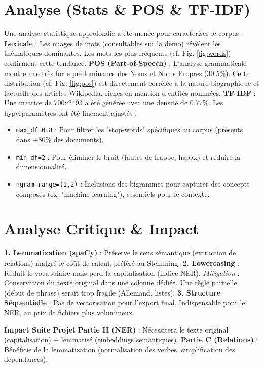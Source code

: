 \documentclass[10pt,a4paper,twocolumn]{article}
\begin{document}
\section*{Analyse (Stats \& POS \& TF-IDF)}
Une analyse statistique approfondie a été menée pour caractériser le corpus :
\textbf{Lexicale} : Les nuages de mots (consultables sur la démo) révèlent les thématiques dominantes. Les mots les plus fréquents (cf. Fig. \ref{fig:words}) confirment cette tendance.
\textbf{POS (Part-of-Speech)} : L'analyse grammaticale montre une très forte prédominance des Noms et Noms Propres (30.5\%). Cette distribution (cf. Fig. \ref{fig:pos}) est directement corrélée à la nature biographique et factuelle des articles Wikipédia, riches en mention d'entités nommées.
\textbf{TF-IDF} : Une matrice de 700x2493 a été générée avec une densité de 0.77\%. Les hyperparamètres ont été finement ajustés :
\begin{itemize}
    \item \texttt{max\_df=0.8} : Pour filtrer les "stop-words" spécifiques au corpus (présents dans +80\% des documents).
    \item \texttt{min\_df=2} : Pour éliminer le bruit (fautes de frappe, hapax) et réduire la dimensionnalité.
    \item \texttt{ngram\_range=(1,2)} : Inclusions des bigrammes pour capturer des concepts composés (ex: "machine learning"), essentiels pour le contexte.
\end{itemize}

\section*{Analyse Critique \& Impact}
\textbf{1. Lemmatization (spaCy)} : Préserve le sens sémantique (extraction de relations) malgré le coût de calcul, préféré au Stemming.
\textbf{2. Lowercasing} : Réduit le vocabulaire mais perd la capitalisation (indice NER). \textit{Mitigation} : Conservation du texte original dans une colonne dédiée. Une règle partielle (début de phrase) serait trop fragile (Allemand, listes).
\textbf{3. Structure Séquentielle} : Pas de vectorisation pour l'export final. Indispensable pour le NER, au prix de fichiers plus volumineux.

\textbf{Impact Suite Projet}
\textbf{Partie II (NER)} : Nécessitera le texte original (capitalisation) + lemmatisé (embeddings sémantiques).
\textbf{Partie C (Relations)} : Bénéficie de la lemmatization (normalisation des verbes, simplification des dépendances).
\end{document}
